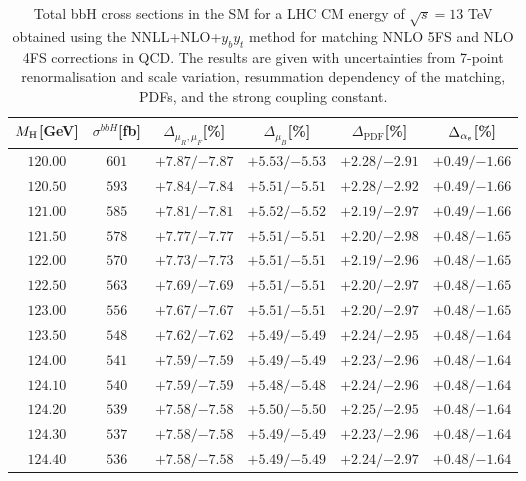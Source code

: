 \begin{table}[ht!]
\caption{Total bbH{} cross sections in the SM for a LHC CM energy of $\sqrt{s}=13$ TeV obtained using the NNLL+NLO+$y_by_t$ method for matching NNLO 5FS and NLO 4FS corrections in QCD. The results are given with uncertainties from 7-point renormalisation and scale variation, resummation dependency of the matching, PDFs, and the strong coupling constant.}
\label{tab:bbH13}
\begin{center}%
\begin{small}%
\begin{tabular}{cccccc}%
\toprule
$M_\mathrm{H}$[GeV] & $\sigma^{bbH}$[fb] & $\Delta_{\mu_{R},\mu_{F}}$[\%] & $\Delta_{\mu_{B}}$[\%] & $\Delta_{\mathrm{PDF}}$[\%] & $\Delta_{\alpha_{\mathrm{s}}}$[\%] \\
\midrule
$120.00$ & $601$ & ${+7.87}/{-7.87}$ & ${+5.53}/{-5.53}$ & ${+2.28}/{-2.91}$ & ${+0.49}/{-1.66}$ \\
$120.50$ & $593$ & ${+7.84}/{-7.84}$ & ${+5.51}/{-5.51}$ & ${+2.28}/{-2.92}$ & ${+0.49}/{-1.66}$ \\
$121.00$ & $585$ & ${+7.81}/{-7.81}$ & ${+5.52}/{-5.52}$ & ${+2.19}/{-2.97}$ & ${+0.49}/{-1.66}$ \\
$121.50$ & $578$ & ${+7.77}/{-7.77}$ & ${+5.51}/{-5.51}$ & ${+2.20}/{-2.98}$ & ${+0.48}/{-1.65}$ \\
$122.00$ & $570$ & ${+7.73}/{-7.73}$ & ${+5.51}/{-5.51}$ & ${+2.19}/{-2.96}$ & ${+0.48}/{-1.65}$ \\
$122.50$ & $563$ & ${+7.69}/{-7.69}$ & ${+5.51}/{-5.51}$ & ${+2.20}/{-2.97}$ & ${+0.48}/{-1.65}$ \\
$123.00$ & $556$ & ${+7.67}/{-7.67}$ & ${+5.51}/{-5.51}$ & ${+2.20}/{-2.97}$ & ${+0.48}/{-1.65}$ \\
$123.50$ & $548$ & ${+7.62}/{-7.62}$ & ${+5.49}/{-5.49}$ & ${+2.24}/{-2.95}$ & ${+0.48}/{-1.64}$ \\
$124.00$ & $541$ & ${+7.59}/{-7.59}$ & ${+5.49}/{-5.49}$ & ${+2.23}/{-2.96}$ & ${+0.48}/{-1.64}$ \\
$124.10$ & $540$ & ${+7.59}/{-7.59}$ & ${+5.48}/{-5.48}$ & ${+2.24}/{-2.96}$ & ${+0.48}/{-1.64}$ \\
$124.20$ & $539$ & ${+7.58}/{-7.58}$ & ${+5.50}/{-5.50}$ & ${+2.25}/{-2.95}$ & ${+0.48}/{-1.64}$ \\
$124.30$ & $537$ & ${+7.58}/{-7.58}$ & ${+5.49}/{-5.49}$ & ${+2.23}/{-2.96}$ & ${+0.48}/{-1.64}$ \\
$124.40$ & $536$ & ${+7.58}/{-7.58}$ & ${+5.49}/{-5.49}$ & ${+2.24}/{-2.97}$ & ${+0.48}/{-1.64}$ \\

\end{tabular}
\end{small}
\end{center}
\end{table}
